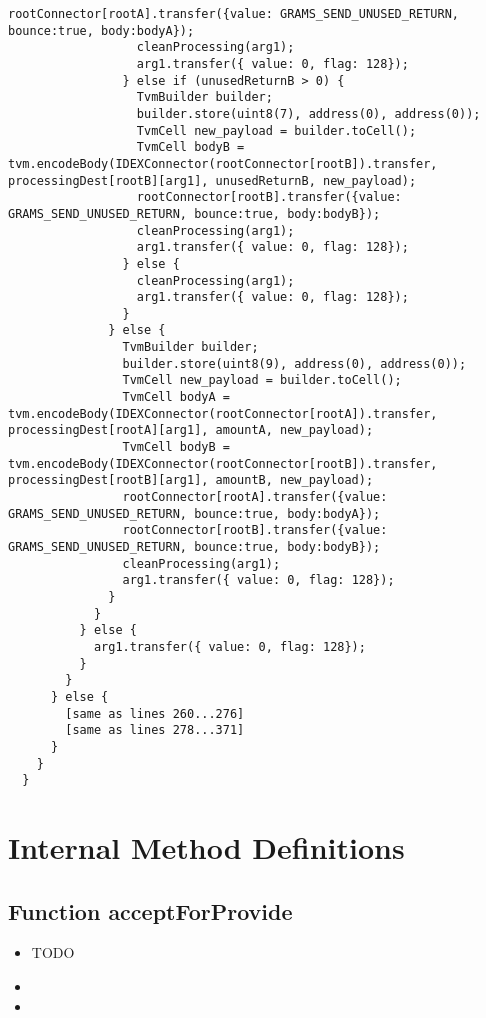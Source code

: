 \begin{lstlisting}[firstnumber=248]
                  rootConnector[rootA].transfer({value: GRAMS_SEND_UNUSED_RETURN, bounce:true, body:bodyA});
                  cleanProcessing(arg1);
                  arg1.transfer({ value: 0, flag: 128});
                } else if (unusedReturnB > 0) {
                  TvmBuilder builder;
                  builder.store(uint8(7), address(0), address(0));
                  TvmCell new_payload = builder.toCell();
                  TvmCell bodyB = tvm.encodeBody(IDEXConnector(rootConnector[rootB]).transfer, processingDest[rootB][arg1], unusedReturnB, new_payload);
                  rootConnector[rootB].transfer({value: GRAMS_SEND_UNUSED_RETURN, bounce:true, body:bodyB});
                  cleanProcessing(arg1);
                  arg1.transfer({ value: 0, flag: 128});
                } else {
                  cleanProcessing(arg1);
                  arg1.transfer({ value: 0, flag: 128});
                }
              } else {
                TvmBuilder builder;
                builder.store(uint8(9), address(0), address(0));
                TvmCell new_payload = builder.toCell();
                TvmCell bodyA = tvm.encodeBody(IDEXConnector(rootConnector[rootA]).transfer, processingDest[rootA][arg1], amountA, new_payload);
                TvmCell bodyB = tvm.encodeBody(IDEXConnector(rootConnector[rootB]).transfer, processingDest[rootB][arg1], amountB, new_payload);
                rootConnector[rootA].transfer({value: GRAMS_SEND_UNUSED_RETURN, bounce:true, body:bodyA});
                rootConnector[rootB].transfer({value: GRAMS_SEND_UNUSED_RETURN, bounce:true, body:bodyB});
                cleanProcessing(arg1);
                arg1.transfer({ value: 0, flag: 128});
              }
            }
          } else {
            arg1.transfer({ value: 0, flag: 128});
          }
        }
      } else {
        [same as lines 260...276]
        [same as lines 278...371]
      }
    }
  }
\end{lstlisting}

\section{Internal Method Definitions}

\subsection{Function acceptForProvide}

\begin{itemize}
\item TODO
\item \issueError{}
\item \issueInternal
\end{itemize}

